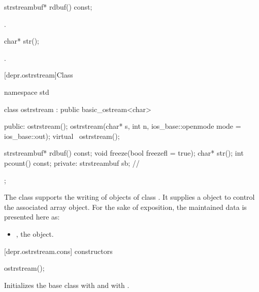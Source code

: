 %
\begin{itemdecl}
strstreambuf* rdbuf() const;
\end{itemdecl}

\begin{itemdescr}
\pnum
\returns
{}.
\end{itemdescr}

%
\begin{itemdecl}
char* str();
\end{itemdecl}

\begin{itemdescr}
\pnum
\returns
{}.
\end{itemdescr}

[depr.ostrstream]{Class }

%
\begin{codeblock}
namespace std {
  class ostrstream : public basic_ostream<char> {
  public:
    ostrstream();
    ostrstream(char* s, int n, ios_base::openmode mode = ios_base::out);
    virtual ~ostrstream();

    strstreambuf* rdbuf() const;
    void freeze(bool freezefl = true);
    char* str();
    int pcount() const;
  private:
    strstreambuf sb;            // \expos
  };
}
\end{codeblock}

\pnum
The class
supports the writing of objects of class
.
It supplies a
object to control the associated array object.
For the sake of exposition, the maintained data is presented here as:

\begin{itemize}
\item
{}, the  object.
\end{itemize}

[depr.ostrstream.cons]{ constructors}

%
\begin{itemdecl}
ostrstream();
\end{itemdecl}

\begin{itemdescr}
\pnum
\effects
Initializes the base class with  and
 with .
\end{itemdescr}

